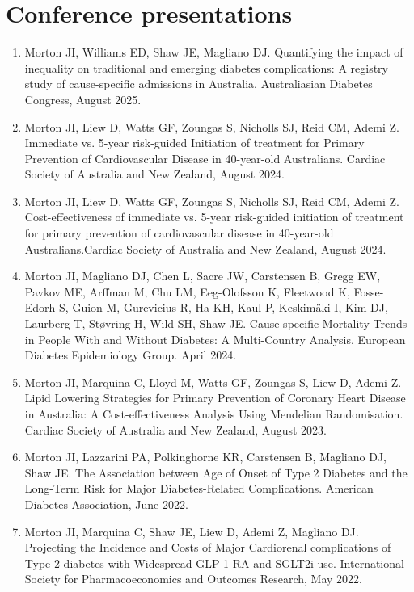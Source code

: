 \documentclass[11pt]{article}
\begin{document}
\section*{Conference presentations}
\begin{enumerate}
\item Morton JI, Williams ED, Shaw JE, Magliano DJ. 
Quantifying the impact of inequality on traditional and emerging diabetes complications: 
A registry study of cause-specific admissions in Australia.
Australiasian Diabetes Congress, August 2025.
\item Morton JI, Liew D, Watts GF, Zoungas S, Nicholls SJ, Reid CM, Ademi Z.
Immediate vs. 5-year risk-guided Initiation of treatment for Primary Prevention of 
Cardiovascular Disease in 40-year-old Australians.
Cardiac Society of Australia and New Zealand, August 2024.
\item Morton JI, Liew D, Watts GF, Zoungas S, Nicholls SJ, Reid CM, Ademi Z.
Cost-effectiveness of immediate vs. 5-year risk-guided initiation of treatment for primary 
prevention of cardiovascular disease in 40-year-old Australians.Cardiac Society of Australia and New Zealand, August 2024.
\item Morton JI, Magliano DJ, Chen L, Sacre JW, Carstensen B, Gregg EW, Pavkov ME, Arffman M, 
Chu LM, Eeg-Olofsson K, Fleetwood K, Fosse-Edorh S, Guion M, Gurevicius R, Ha KH, Kaul P, 
Keskim{\"a}ki I, Kim DJ, Laurberg T, St{\o}vring H, Wild SH, Shaw JE. Cause-specific
Mortality Trends in People With and Without Diabetes: A Multi-Country Analysis. 
European Diabetes Epidemiology Group. April 2024.
\item Morton JI, Marquina C, Lloyd M, Watts GF, Zoungas S, Liew D, Ademi Z. 
Lipid Lowering Strategies for Primary Prevention of Coronary Heart Disease in Australia: 
A Cost-effectiveness Analysis Using Mendelian Randomisation. 
Cardiac Society of Australia and New Zealand, August 2023.
\item Morton JI, Lazzarini PA, Polkinghorne KR, Carstensen B, Magliano DJ, Shaw JE. 
The Association between Age of Onset of Type 2 Diabetes and the Long-Term Risk for Major Diabetes-Related Complications. 
American Diabetes Association, June 2022. 
\item Morton JI, Marquina C, Shaw JE, Liew D, Ademi Z, Magliano DJ. 
Projecting the Incidence and Costs of Major Cardiorenal complications of 
Type 2 diabetes with Widespread GLP-1 RA and SGLT2i use. 
International Society for Pharmacoeconomics and Outcomes Research, May 2022.

\end{enumerate}
\end{document}
